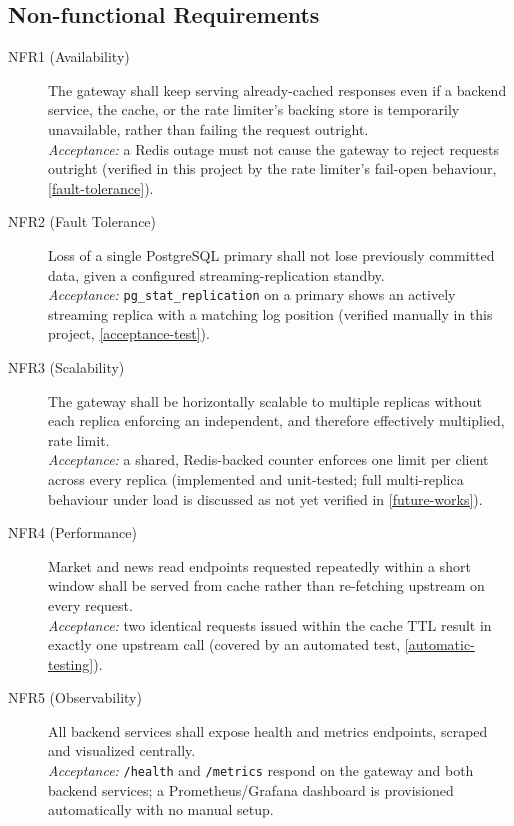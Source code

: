 \documentclass{scrartcl}
\begin{document}
\subsection{Non-functional Requirements}\label{non-functional-requirements}

\begin{description}
  \item[NFR1 (Availability)] The gateway shall keep serving already-cached responses even if a
  backend service, the cache, or the rate limiter's backing store is temporarily unavailable,
  rather than failing the request outright. \\
  \emph{Acceptance:} a Redis outage must not cause the gateway to reject requests outright
  (verified in this project by the rate limiter's fail-open behaviour, \cref{fault-tolerance}).

  \item[NFR2 (Fault Tolerance)] Loss of a single PostgreSQL primary shall not lose previously
  committed data, given a configured streaming-replication standby. \\
  \emph{Acceptance:} \texttt{pg\_stat\_replication} on a primary shows an actively streaming
  replica with a matching log position (verified manually in this project, \cref{acceptance-test}).

  \item[NFR3 (Scalability)] The gateway shall be horizontally scalable to multiple replicas
  without each replica enforcing an independent, and therefore effectively multiplied, rate
  limit. \\
  \emph{Acceptance:} a shared, Redis-backed counter enforces one limit per client across every
  replica (implemented and unit-tested; full multi-replica behaviour under load is discussed as
  not yet verified in \cref{future-works}).

  \item[NFR4 (Performance)] Market and news read endpoints requested repeatedly within a short
  window shall be served from cache rather than re-fetching upstream on every request. \\
  \emph{Acceptance:} two identical requests issued within the cache TTL result in exactly one
  upstream call (covered by an automated test, \cref{automatic-testing}).

  \item[NFR5 (Observability)] All backend services shall expose health and metrics endpoints,
  scraped and visualized centrally. \\
  \emph{Acceptance:} \texttt{/health} and \texttt{/metrics} respond on the gateway and both
  backend services; a Prometheus/Grafana dashboard is provisioned automatically with no manual
  setup.
\end{description}
\end{document}
